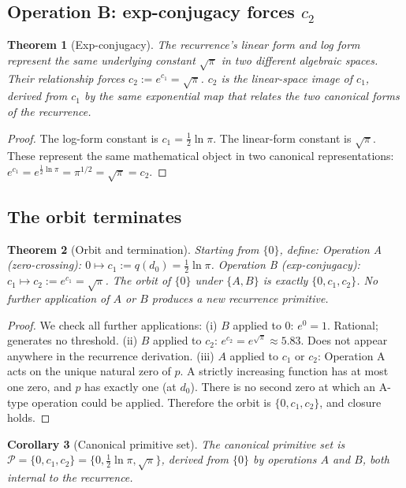 \documentclass[11pt,a4paper]{article}
\newtheorem{theorem}{Theorem}[section]
\newtheorem{corollary}[theorem]{Corollary}
\begin{document}
\subsection{Operation B: exp-conjugacy forces $c_2$}

\begin{theorem}[Exp-conjugacy]
The recurrence's linear form and log form represent the same underlying constant $\sqrt{\pi}$ in two different algebraic spaces. Their relationship forces $c_2 := e^{c_1} = \sqrt{\pi}$. $c_2$ is the linear-space image of $c_1$, derived from $c_1$ by the same exponential map that relates the two canonical forms of the recurrence.
\end{theorem}

\begin{proof}
The log-form constant is $c_1 = \frac{1}{2}\ln\pi$. The linear-form constant is $\sqrt{\pi}$. These represent the same mathematical object in two canonical representations: $e^{c_1} = e^{\frac{1}{2}\ln\pi} = \pi^{1/2} = \sqrt{\pi} = c_2$.
\end{proof}

\subsection{The orbit terminates}

\begin{theorem}[Orbit and termination]
Starting from $\{0\}$, define: Operation A (zero-crossing): $0\mapsto c_1 := q(d_0) = \frac{1}{2}\ln\pi$. Operation B (exp-conjugacy): $c_1\mapsto c_2 := e^{c_1} = \sqrt{\pi}$. The orbit of $\{0\}$ under $\{A,B\}$ is exactly $\{0, c_1, c_2\}$. No further application of $A$ or $B$ produces a new recurrence primitive.
\end{theorem}

\begin{proof}
We check all further applications: (i) $B$ applied to $0$: $e^0 = 1$. Rational; generates no threshold. (ii) $B$ applied to $c_2$: $e^{c_2} = e^{\sqrt{\pi}}\approx 5.83$. Does not appear anywhere in the recurrence derivation. (iii) $A$ applied to $c_1$ or $c_2$: Operation A acts on the unique natural zero of $p$. A strictly increasing function has at most one zero, and $p$ has exactly one (at $d_0$). There is no second zero at which an A-type operation could be applied. Therefore the orbit is $\{0, c_1, c_2\}$, and closure holds.
\end{proof}

\begin{corollary}[Canonical primitive set]
The canonical primitive set is $\mathcal{P} = \{0, c_1, c_2\} = \{0, \frac{1}{2}\ln\pi, \sqrt{\pi}\}$, derived from $\{0\}$ by operations $A$ and $B$, both internal to the recurrence.
\end{corollary}
\end{document}
